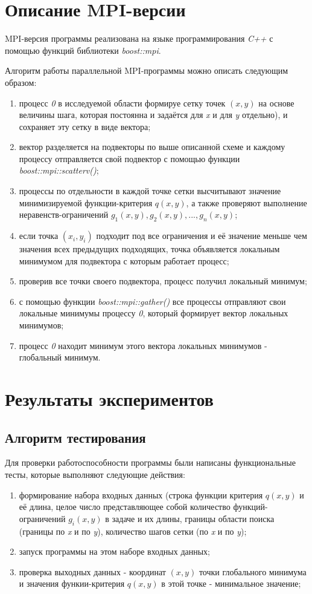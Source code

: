 \documentclass[12pt]{article}
\begin{document}
\section{Описание MPI-версии}
MPI-версия программы реализована на языке программирования \textit{C++} с помощью функций библиотеки \textit{boost::mpi}.

Алгоритм работы параллельной MPI-программы можно описать следующим образом:
\begin{enumerate}
    \item процесс \textit{0} в исследуемой области формируе сетку точек \textit{$(x, y)$} на основе величины шага, которая постоянна и задаётся для \textit{x} и для \textit{y} отдельно), и сохраняет эту сетку в виде вектора;
    \item вектор разделяется на подвекторы по выше описанной схеме и каждому процессу отправляется свой подвектор с помощью функции \textit{boost::mpi::scatterv()};
    \item процессы по отдельности в каждой точке сетки высчитывают значение минимизируемой функции-критерия \textit{$q(x, y)$}, а также проверяют выполнение неравенств-ограничений \textit{$g_1(x, y), g_2(x, y), ..., g_n(x, y)$};
    \item если точка \textit{$(x_i, y_i)$} подходит под все ограничения и её значение меньше чем значения всех предыдущих подходящих, точка объявляется локальным минимумом для подвектора с которым работает процесс;
    \item проверив все точки своего подвектора, процесс получил локальный минимум;
    \item с помощью функции \textit{boost::mpi::gather()} все процессы отправляют свои локальные минимумы процессу \textit{0}, который формирует вектор локальных минимумов;
    \item процесс \textit{0} находит минимум этого вектора локальных минимумов - глобальный минимум.
\end{enumerate}

\section{Результаты экспериментов}
\subsection{Алгоритм тестирования}
Для проверки работоспособности программы были написаны функциональные тесты, которые выполняют следующие действия:
\begin{enumerate}
    \item формирование набора входных данных (строка функции критерия \textit{$q(x, y)$} и её длина, целое число представляющее собой количество функций-ограничений \textit{$g_i(x, y)$} в задаче и их длины, границы области поиска (границы по \textit{x} и по \textit{y}), количество шагов сетки (по \textit{x} и по \textit{y});
    \item запуск программы на этом наборе входных данных;
    \item проверка выходных данных - координат \textit{$(x, y)$} точки глобального минимума и значения функии-критерия \textit{$q(x, y)$} в 
    этой точке - минимальное значение;
\end{enumerate}
\end{document}
